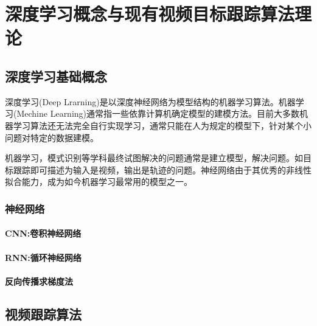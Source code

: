 \chapter{深度学习概念与现有视频目标跟踪算法理论}
\section{深度学习基础概念}
深度学习(Deep Lrarning)是以深度神经网络为模型结构的机器学习算法\supercite{deng2014deep}。机器学习(Mechine Learning)通常指一些依靠计算机确定模型的建模方法。目前大多数机器学习算法还无法完全自行实现学习，通常只能在人为规定的模型下，针对某个小问题对特定的数据建模。
\par
机器学习，模式识别等学科最终试图解决的问题通常是建立模型，解决问题。如目标跟踪即可描述为输入是视频，输出是轨迹的问题。神经网络由于其优秀的非线性拟合能力，成为如今机器学习最常用的模型之一。
\subsection{神经网络}

\subsubsection{CNN:卷积神经网络}
\subsubsection{RNN:循环神经网络}
\subsubsection{反向传播求梯度法}

\section{视频跟踪算法}
